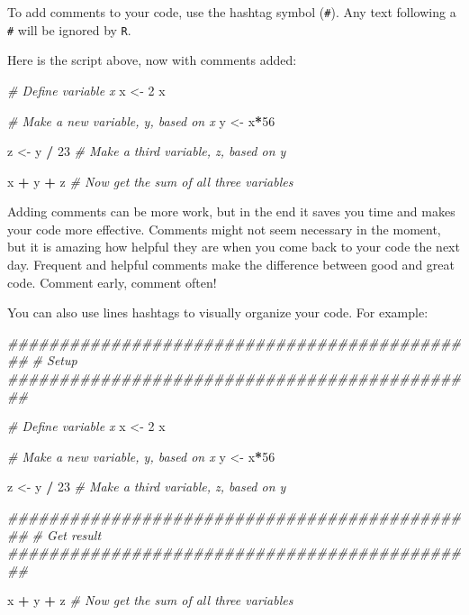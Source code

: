 \documentclass[
]{book}
\newenvironment{Shaded}{\begin{snugshade}}{\end{snugshade}}
\newcommand{\CommentTok}[1]{\textcolor[rgb]{0.56,0.35,0.01}{\textit{#1}}}
\newcommand{\DecValTok}[1]{\textcolor[rgb]{0.00,0.00,0.81}{#1}}
\newcommand{\NormalTok}[1]{#1}
\newcommand{\OperatorTok}[1]{\textcolor[rgb]{0.81,0.36,0.00}{\textbf{#1}}}
\newcommand{\StringTok}[1]{\textcolor[rgb]{0.31,0.60,0.02}{#1}}
\begin{document}
To add comments to your code, use the hashtag symbol (\texttt{\#}). Any text following a \texttt{\#} will be ignored by \texttt{R}.

Here is the script above, now with comments added:

\begin{Shaded}
\begin{Highlighting}[]
\CommentTok{# Define variable x}
\NormalTok{x <-}\StringTok{ }\DecValTok{2} 
\NormalTok{x}

\CommentTok{# Make a new variable, y, based on x}
\NormalTok{y <-}\StringTok{ }\NormalTok{x}\OperatorTok{*}\DecValTok{56}

\NormalTok{z <-}\StringTok{ }\NormalTok{y }\OperatorTok{/}\StringTok{ }\DecValTok{23} \CommentTok{# Make a third variable, z, based on y}
 
\NormalTok{x }\OperatorTok{+}\StringTok{ }\NormalTok{y }\OperatorTok{+}\StringTok{ }\NormalTok{z }\CommentTok{# Now get the sum of all three variables}
\end{Highlighting}
\end{Shaded}

Adding comments can be more work, but in the end it saves you time and makes your code more effective. Comments might not seem necessary in the moment, but it is amazing how helpful they are when you come back to your code the next day. Frequent and helpful comments make the difference between good and great code. Comment early, comment often!

You can also use lines hashtags to visually organize your code. For example:

\begin{Shaded}
\begin{Highlighting}[]
\CommentTok{##############################################}
\CommentTok{# Setup}
\CommentTok{##############################################}

\CommentTok{# Define variable x}
\NormalTok{x <-}\StringTok{ }\DecValTok{2} 
\NormalTok{x}

\CommentTok{# Make a new variable, y, based on x}
\NormalTok{y <-}\StringTok{ }\NormalTok{x}\OperatorTok{*}\DecValTok{56}

\NormalTok{z <-}\StringTok{ }\NormalTok{y }\OperatorTok{/}\StringTok{ }\DecValTok{23} \CommentTok{# Make a third variable, z, based on y}
 

\CommentTok{##############################################}
\CommentTok{# Get result}
\CommentTok{##############################################}

\NormalTok{x }\OperatorTok{+}\StringTok{ }\NormalTok{y }\OperatorTok{+}\StringTok{ }\NormalTok{z }\CommentTok{# Now get the sum of all three variables}
\end{Highlighting}
\end{Shaded}
\end{document}

